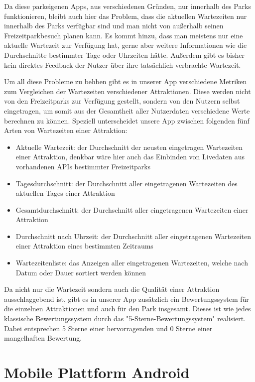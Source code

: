 Da diese parkeigenen Apps, aus verschiedenen Gründen, nur innerhalb des Parks funktionieren, bleibt auch hier das Problem, dass die aktuellen Wartezeiten nur innerhalb des Parks verfügbar sind und man nicht von außerhalb seinen Freizeitparkbesuch planen kann. Es kommt hinzu, dass man meistens nur eine aktuelle Wartezeit zur Verfügung hat, gerne aber weitere Informationen wie die Durchschnitte bestimmter Tage oder Uhrzeiten hätte. Außerdem gibt es bisher kein direktes Feedback der Nutzer über ihre tatsächlich verbrachte Wartezeit. 

Um all diese Probleme zu behben gibt es in unserer App verschiedene Metriken zum Vergleichen der Wartezeiten verschiedener Attraktionen. Diese werden nicht von den Freizeitparks zur Verfügung gestellt, sondern von den Nutzern selbst eingetragen, um somit aus der Gesamtheit aller Nutzerdaten verschiedene Werte berechnen zu können. Speziell unterscheidet unsere App zwischen folgenden fünf Arten von Wartezeiten einer Attraktion:
\begin{itemize}
\item Aktuelle Wartezeit: der Durchschnitt der neusten eingetragen Wartezeiten einer Attraktion, denkbar wäre hier auch das Einbinden von Livedaten aus vorhandenen APIs bestimmter Freizeitparks
\item Tagesdurchschnitt: der Durchschnitt aller eingetragenen Wartezeiten des aktuellen Tages einer Attraktion
\item Gesamtdurchschnitt: der Durchschnitt aller eingetragenen Wartezeiten einer Attraktion
\item Durchschnitt nach Uhrzeit: der Durchschnitt aller eingetragenen Wartezeiten einer Attraktion eines bestimmten Zeitraums
\item Wartezeitenliste: das Anzeigen aller eingetragenen Wartezeiten, welche nach Datum oder Dauer sortiert werden können
\end{itemize}

Da nicht nur die Wartezeit sondern auch die Qualität einer Attraktion ausschlaggebend ist, gibt es in unserer App zusätzlich ein Bewertungssystem für die einzelnen Attraktionen und auch für den Park insgesamt. Dieses ist wie jedes klassische Bewertungssystem durch das "5-Sterne-Bewertungssystem" realisiert. Dabei entsprechen 5 Sterne einer hervorragenden und 0 Sterne einer mangelhaften Bewertung.

\section{Mobile Plattform Android}
\label{sec:grundlagen:plattforml}

